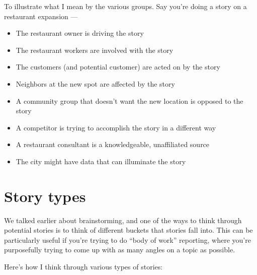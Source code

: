 \documentclass[
  11pt,
  american,
  letterpaperpaper,
  extrafontsizes,onecolumn,openright
  ]{memoir}
\providecommand{\tightlist}{%
  \setlength{\itemsep}{0pt}\setlength{\parskip}{0pt}}
\begin{document}
To illustrate what I mean by the various groups. Say you're doing a story on a restaurant expansion ---

\begin{itemize}
\tightlist
\item
  The restaurant owner is driving the story
\item
  The restaurant workers are involved with the story
\item
  The customers (and potential customer) are acted on by the story
\item
  Neighbors at the new spot are affected by the story
\item
  A community group that doesn't want the new location is opposed to the story
\item
  A competitor is trying to accomplish the story in a different way
\item
  A restaurant consultant is a knowledgeable, unaffiliated source
\item
  The city might have data that can illuminate the story
\end{itemize}

\hypertarget{story-types}{%
\chapter{Story types}\label{story-types}}

We talked earlier about brainstorming, and one of the ways to think through potential stories is to think of different buckets that stories fall into. This can be particularly useful if you're trying to do \enquote{body of work} reporting, where you're purposefully trying to come up with as many angles on a topic as possible.

Here's how I think through various types of stories:
\end{document}
